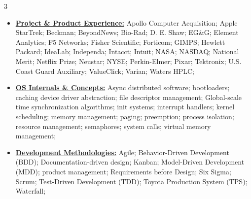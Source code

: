\documentclass[letterpaper,11pt]{article}
\begin{document}
\begin{multicols}{3}
{\begin{itemize}[leftmargin=0.1in, label={}, itemsep=0pt, parsep=0pt, topsep=0pt, partopsep=0pt]
                \item
                \textbf{\uline{Project \& Product Experience:}} \hspace{0pt}
                Apollo Computer Acquisition;
                Apple StarTrek;
                Beckman;
                BeyondNews;
                Bio-Rad;
                D. E. Shaw;
                EG\&G;
                Element Analytics;
                F5 Networks;
                Fisher Scientific;
                Forticom;
                GIMPS;
                Hewlett Packard;
                IdeaLab;
                Independa;
                Intacct;
                Intuit;
                NASA;
                NASDAQ;
                National Merit;
                Netflix Prize;
                Neustar;
                NYSE;
                Perkin-Elmer;
                Pixar;
                Tektronix;
                U.S. Coast Guard Auxiliary;
                ValueClick;
                Varian;
                Waters HPLC;

                \item
                \textbf{\uline{OS Internals \& Concepts:}} \hspace{0pt}
                Async distributed software;
                bootloaders;
                caching
                device driver abstraction;
                file descriptor management;
                Global-scale time synchronization algorithms;
                init systems;
                interrupt handlers;
                kernel scheduling;
                memory management;
                paging;
                preemption;
                process isolation;
                resource management;
                semaphores;
                system calls;
                virtual memory management;

                \item
                \textbf{\uline{Development Methodologies:}} \hspace{0pt}
                Agile;
                Behavior-Driven Development (BDD);
                Documentation-driven design;
                Kanban;
                Model-Driven Development (MDD);
                product management;
                Requirements before Design;
                Six Sigma;
                Scrum;
                Test-Driven Development (TDD);
                Toyota Production System (TPS);
                Waterfall;


\end{itemize}}
\end{multicols}
\end{document}
